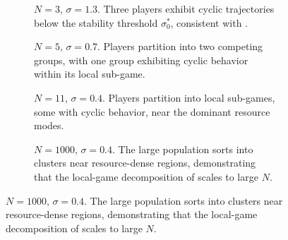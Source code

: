 \documentclass{article}
\begin{document}
        \begin{figure}[ht!]
            \centering
            \begin{subfigure}[b]{0.45\linewidth}
                \centering
                
                \caption{$N=3$, $\sigma=1.3$.
                    Three players exhibit cyclic trajectories below the stability threshold $\sigma_0^*$, consistent with .}
                \label{fig:linkedin_trajectories:a}
                \vspace{4ex}
            \end{subfigure}
            \begin{subfigure}[b]{0.45\linewidth}
                \centering
                
                \caption{$N=5$, $\sigma=0.7$.
                    Players partition into two competing groups, with one group exhibiting cyclic behavior within its local sub-game.}
                \label{fig:linkedin_trajectories:b}
                \vspace{4ex}
            \end{subfigure}
            \begin{subfigure}[b]{0.45\linewidth}
                \centering
                
                \caption{$N=11$, $\sigma=0.4$.
                    Players partition into local sub-games, some with cyclic behavior, near the dominant resource modes.}
                \label{fig:linkedin_trajectories:c}
                \vspace{4ex}
            \end{subfigure}
            \begin{subfigure}[b]{0.45\linewidth}
                \centering
                
                \caption{$N=1000$, $\sigma=0.4$.
                    The large population sorts into clusters near resource-dense regions, demonstrating that the local-game decomposition of  scales to large $N$.}
                \label{fig:linkedin_trajectories:d}
                \vspace{4ex}
            \end{subfigure}

\end{figure}
\end{document}

